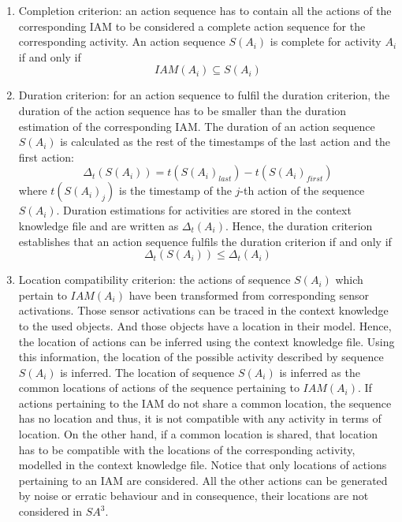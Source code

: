 \begin{enumerate}
  \item Completion criterion: an action sequence has to contain all the actions of the corresponding IAM to be considered a complete action sequence for the corresponding activity. An action sequence $S(A_i)$ is complete for activity $A_i$ if and only if 
  \begin{equation}
  \label{eq-completion}
  IAM(A_i) \subseteq S(A_i)   
  \end{equation}
  
  \item Duration criterion: for an action sequence to fulfil the duration criterion, the duration of the action sequence has to be smaller than the duration estimation of the corresponding IAM. The duration of an action sequence $S(A_i)$ is calculated as the rest of the timestamps of the last action and the first action: 
  \begin{equation}
    \Delta_t(S(A_i)) = t(S(A_i)_{last}) - t(S(A_i)_{first})
  \end{equation}
  where $t(S(A_i)_j)$ is the timestamp of the $j$-th action of the sequence $S(A_i)$. Duration estimations for activities are stored in the context knowledge file and are written as $\Delta_t(A_i)$. Hence, the duration criterion establishes that an action sequence fulfils the duration criterion if and only if 
  \begin{equation}
   \label{eq-duration}
   \Delta_t(S(A_i)) \leq \Delta_t(A_i)
  \end{equation}  
  
  \item Location compatibility criterion: the actions of sequence $S(A_i)$ which pertain to $IAM(A_i)$ have been transformed from corresponding sensor activations. Those sensor activations can be traced in the context knowledge to the used objects. And those objects have a location in their model. Hence, the location of actions can be inferred using the context knowledge file. Using this information, the location of the possible activity described by sequence $S(A_i)$ is inferred. The location of sequence $S(A_i)$ is inferred as the common locations of actions of the sequence pertaining to $IAM(A_i)$. If actions pertaining to the IAM do not share a common location, the sequence has no location and thus, it is not compatible with any activity in terms of location. On the other hand, if a common location is shared, that location has to be compatible with the locations of the corresponding activity, modelled in the context knowledge file. Notice that only locations of actions pertaining to an IAM are considered. All the other actions can be generated by noise or erratic behaviour and in consequence, their locations are not considered in $SA^3$.
 \end{enumerate}

